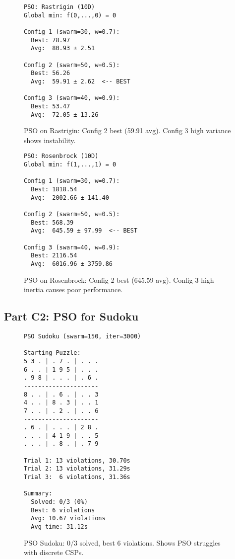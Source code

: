 \documentclass[letterpaper]{article}
\begin{document}
\begin{figure}[h]
\begin{scriptsize}
\begin{verbatim}
PSO: Rastrigin (10D)
Global min: f(0,...,0) = 0

Config 1 (swarm=30, w=0.7):
  Best: 78.97
  Avg:  80.93 ± 2.51

Config 2 (swarm=50, w=0.5):
  Best: 56.26
  Avg:  59.91 ± 2.62  <-- BEST

Config 3 (swarm=40, w=0.9):
  Best: 53.47
  Avg:  72.05 ± 13.26
\end{verbatim}
\end{scriptsize}
\caption{PSO on Rastrigin: Config 2 best (59.91 avg). Config 3 high variance shows instability.}
\label{fig:pso-rastrigin}
\end{figure}

\begin{figure}[h]
\begin{scriptsize}
\begin{verbatim}
PSO: Rosenbrock (10D)
Global min: f(1,...,1) = 0

Config 1 (swarm=30, w=0.7):
  Best: 1818.54
  Avg:  2002.66 ± 141.40

Config 2 (swarm=50, w=0.5):
  Best: 568.39
  Avg:  645.59 ± 97.99  <-- BEST

Config 3 (swarm=40, w=0.9):
  Best: 2116.54
  Avg:  6016.96 ± 3759.86
\end{verbatim}
\end{scriptsize}
\caption{PSO on Rosenbrock: Config 2 best (645.59 avg). Config 3 high inertia causes poor performance.}
\label{fig:pso-rosenbrock}
\end{figure}

\subsection{Part C2: PSO for Sudoku}

\begin{figure}[h]
\begin{scriptsize}
\begin{verbatim}
PSO Sudoku (swarm=150, iter=3000)

Starting Puzzle:
5 3 . | . 7 . | . . .
6 . . | 1 9 5 | . . .
. 9 8 | . . . | . 6 .
---------------------
8 . . | . 6 . | . . 3
4 . . | 8 . 3 | . . 1
7 . . | . 2 . | . . 6
---------------------
. 6 . | . . . | 2 8 .
. . . | 4 1 9 | . . 5
. . . | . 8 . | . 7 9

Trial 1: 13 violations, 30.70s
Trial 2: 13 violations, 31.29s
Trial 3:  6 violations, 31.36s

Summary:
  Solved: 0/3 (0%)
  Best: 6 violations
  Avg: 10.67 violations
  Avg time: 31.12s
\end{verbatim}
\end{scriptsize}
\caption{PSO Sudoku: 0/3 solved, best 6 violations. Shows PSO struggles with discrete CSPs.}
\label{fig:pso-sudoku}
\end{figure}



\end{document}
